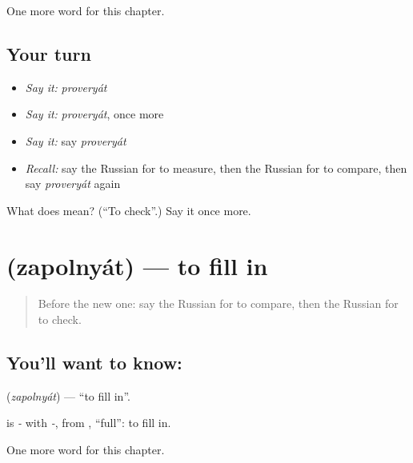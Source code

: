 \begin{grammarlens}[title={What you've built}]
One more word for this chapter.
\end{grammarlens}

\subsection*{Your turn}
\begin{itemize}
\raggedright
  \item \emph{Say it:} \emph{proveryát}
  \item \emph{Say it:} \emph{proveryát}, once more
  \item \emph{Say it:} say \emph{proveryát}
  \item \emph{Recall:} say the Russian for to measure, then the Russian for to compare, then say \emph{proveryát} again
\end{itemize}

\begin{tcolorbox}[breakable,colback=teal!4,colframe=teal!35!black,title={Before you move on}]
What does  mean? (\textquotedblleft{}To check\textquotedblright{}.) Say it once more.
\end{tcolorbox}
\section[\texorpdfstring{\ru{заполнять} (zapolnyát)}{заполнять (zapolnyát)}]{ (zapolnyát) — to fill in}

\label{lesson:RU-C236-zapolnyat}



\begin{quote}
Before the new one: say the Russian for to compare, then the Russian for to check.
\end{quote}

\subsection*{You'll want to know: }
\textbf{} (\emph{zapolnyát}) — \textquotedblleft{}to fill in\textquotedblright{}.

\begin{cousinweb}
\textbf{} is \emph{-} with \emph{-}, from \emph{}, \textquotedblleft{}full\textquotedblright{}: to fill in.
\end{cousinweb}

\begin{grammarlens}[title={What you've built}]
One more word for this chapter.
\end{grammarlens}

